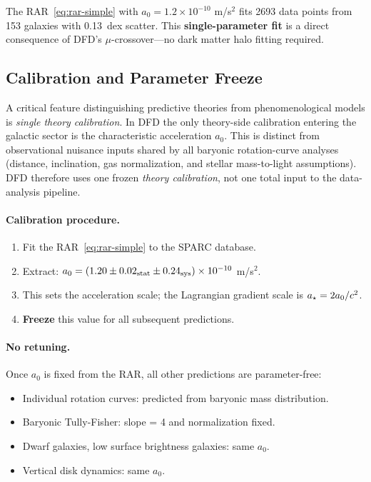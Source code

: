 \begin{tcolorbox}[colback=green!5!white, colframe=green!50!black, title=Key Result: RAR Match]
The RAR~\eqref{eq:rar-simple} with $a_0 = 1.2 \times 10^{-10}$ m/s$^2$ fits 2693 data points from 153 galaxies with 0.13~dex scatter. This \textbf{single-parameter fit} is a direct consequence of DFD's $\mu$-crossover---no dark matter halo fitting required.
\end{tcolorbox}

\subsection{Calibration and Parameter Freeze}\label{sec:galactic-calibration}

A critical feature distinguishing predictive theories from phenomenological models is \textit{single theory calibration}.  In DFD the only theory-side calibration entering the galactic sector is the characteristic acceleration $a_0$.  This is distinct from observational nuisance inputs shared by all baryonic rotation-curve analyses (distance, inclination, gas normalization, and stellar mass-to-light assumptions).  DFD therefore uses one frozen \emph{theory calibration}, not one total input to the data-analysis pipeline.

\paragraph{Calibration procedure.}
\begin{enumerate}
\item Fit the RAR~\eqref{eq:rar-simple} to the SPARC database.
\item Extract: $a_0 = (1.20 \pm 0.02_{\rm stat} \pm 0.24_{\rm sys}) \times 10^{-10}$ m/s$^2$.
\item This sets the acceleration scale; the Lagrangian gradient scale is $a_\star = 2a_0/c^2$.
\item \textbf{Freeze} this value for all subsequent predictions.
\end{enumerate}

\paragraph{No retuning.}
Once $a_0$ is fixed from the RAR, all other predictions are parameter-free:
\begin{itemize}
\item Individual rotation curves: predicted from baryonic mass distribution.
\item Baryonic Tully-Fisher: slope = 4 and normalization fixed.
\item Dwarf galaxies, low surface brightness galaxies: same $a_0$.
\item Vertical disk dynamics: same $a_0$.
\end{itemize}

